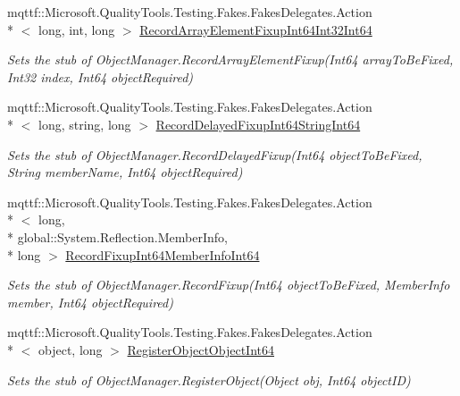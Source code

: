 \begin{DoxyCompactItemize}
mqttf\-::\-Microsoft.\-Quality\-Tools.\-Testing.\-Fakes.\-Fakes\-Delegates.\-Action\\*
$<$ long, int, long $>$ \hyperlink{class_system_1_1_runtime_1_1_serialization_1_1_fakes_1_1_stub_object_manager_adc300fef278c47096c0a1679121e4c10}{Record\-Array\-Element\-Fixup\-Int64\-Int32\-Int64}
\begin{DoxyCompactList}\small\item\em Sets the stub of Object\-Manager.\-Record\-Array\-Element\-Fixup(\-Int64 array\-To\-Be\-Fixed, Int32 index, Int64 object\-Required)\end{DoxyCompactList}\item 
mqttf\-::\-Microsoft.\-Quality\-Tools.\-Testing.\-Fakes.\-Fakes\-Delegates.\-Action\\*
$<$ long, string, long $>$ \hyperlink{class_system_1_1_runtime_1_1_serialization_1_1_fakes_1_1_stub_object_manager_a209e819fe7930498102b666867b14c06}{Record\-Delayed\-Fixup\-Int64\-String\-Int64}
\begin{DoxyCompactList}\small\item\em Sets the stub of Object\-Manager.\-Record\-Delayed\-Fixup(\-Int64 object\-To\-Be\-Fixed, String member\-Name, Int64 object\-Required)\end{DoxyCompactList}\item 
mqttf\-::\-Microsoft.\-Quality\-Tools.\-Testing.\-Fakes.\-Fakes\-Delegates.\-Action\\*
$<$ long, \\*
global\-::\-System.\-Reflection.\-Member\-Info, \\*
long $>$ \hyperlink{class_system_1_1_runtime_1_1_serialization_1_1_fakes_1_1_stub_object_manager_afa498aaebf66a72de63558dda448da86}{Record\-Fixup\-Int64\-Member\-Info\-Int64}
\begin{DoxyCompactList}\small\item\em Sets the stub of Object\-Manager.\-Record\-Fixup(\-Int64 object\-To\-Be\-Fixed, Member\-Info member, Int64 object\-Required)\end{DoxyCompactList}\item 
mqttf\-::\-Microsoft.\-Quality\-Tools.\-Testing.\-Fakes.\-Fakes\-Delegates.\-Action\\*
$<$ object, long $>$ \hyperlink{class_system_1_1_runtime_1_1_serialization_1_1_fakes_1_1_stub_object_manager_a6438e7e8bc254cbc71c59af9dda12a37}{Register\-Object\-Object\-Int64}
\begin{DoxyCompactList}\small\item\em Sets the stub of Object\-Manager.\-Register\-Object(\-Object obj, Int64 object\-I\-D)\end{DoxyCompactList}\end{DoxyCompactItemize}
